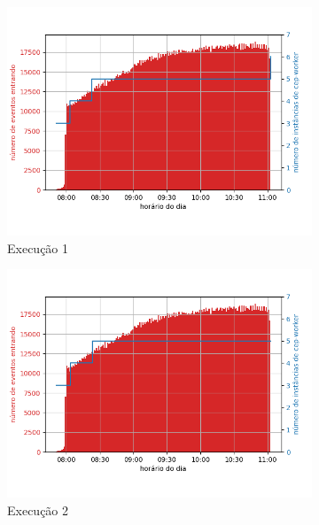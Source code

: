 \begin{figure}[h!]
\begin{subfigure}{.5\textwidth}
  \centering
  \includegraphics[width=\linewidth]{figuras/graphics/carga_e_workers_horario6-dez-is.png}  
  \caption{Execução 1}
  \label{fig:cewh-6-dez-is}
\end{subfigure}
\begin{subfigure}{.5\textwidth}
  \centering
  \includegraphics[width=\linewidth]{figuras/graphics/carga_e_workers_horario7-dez-is.png}  
  \caption{Execução 2}
  \label{fig:cewh-7-dez-is}
\end{subfigure}
\begin{subfigure}{.5\textwidth}

\end{subfigure}
\end{figure}
